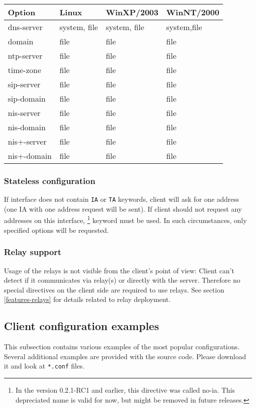 \begin{center}
\begin{tabular}{|l|l|l|l|}
\hline
Option & Linux & WinXP/2003 & WinNT/2000  \\
\hline
dns-server  & system, file & system, file & system,file \\
domain      & file         & file & file \\
ntp-server  & file         & file & file \\
time-zone   & file         & file & file \\
sip-server  & file         & file & file \\
sip-domain  & file         & file & file \\
nis-server  & file         & file & file \\
nis-domain  & file         & file & file \\
nis+-server & file         & file & file \\
nis+-domain & file         & file & file \\
\hline
\end{tabular}
\end{center}

\subsubsection{Stateless configuration}

If interface does not contain \verb+IA+ or \verb+TA+ keywords, client
will ask for one address (one IA with one address request will be sent).
If client should not request any addresses on this interface,
\footnote{In the version 0.2.1-RC1 and earlier, this
  directive was called no-ia. This depreciated name is valid for now,
  but might be removed in future releases.} keyword must be used. In
such circumstances, only specified options will be requested.

\subsubsection{Relay support}
Usage of the relays is not visible from the client's point of view:
Client can't detect if it communicates via relay(s) or directly
with the server. Therefore no special directives on the client side
are required to use relays. See section \ref{features-relays} for
details related to relay deployment.

\subsection{Client configuration examples}
This subsection contains various examples of the most popular
configurations. Several additional examples are provided with the source
code. Please download it and look at \verb+*.conf+ files.

